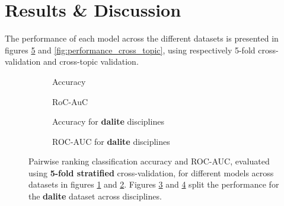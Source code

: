 \documentclass[runningheads]{llncs}
\begin{document}
\section{Results \& Discussion}

The performance of each model across the different datasets is presented 
in figures \ref{fig:performance_k_fold} and \ref{fig:performance_cross_topic}, 
using respectively 5-fold cross-validation and cross-topic validation.  

\begin{figure}
	\begin{subfigure}[t]{0.5\linewidth}
		\centering
		\scalebox{0.4}{}
		\caption{Accuracy}
		\label{fig:acc_kfold}
	\end{subfigure}%
	\qquad
	\begin{subfigure}[t]{0.5\linewidth}
		\centering
		\scalebox{0.4}{}
		\caption{RoC-AuC}
		\label{fig:AUC_kfold}
	\end{subfigure}
	
	\begin{subfigure}[t]{0.5\linewidth}
		\centering
		\scalebox{0.4}{}
		\caption{Accuracy for \textbf{dalite} disciplines}
		\label{fig:acc_dalite_kfold}
	\end{subfigure}%
	\qquad
	\begin{subfigure}[t]{0.5\linewidth}
		\centering
		\scalebox{0.4}{}
		\caption{ROC-AUC for \textbf{dalite} disciplines}
		\label{fig:AUC_dalite_kfold}
	\end{subfigure}	
	\caption{Pairwise ranking classification accuracy and ROC-AUC, evaluated 
	using \textbf{5-fold stratified} cross-validation, for 
		different models across datasets in figures \ref{fig:acc_kfold} and 
		\ref{fig:AUC_kfold}. Figures \ref{fig:acc_dalite_kfold} and 
		\ref{fig:AUC_dalite_kfold} split the performance for the  
		\textbf{dalite} dataset across disciplines.}
	\label{fig:performance_k_fold}
\end{figure}
\end{document}
